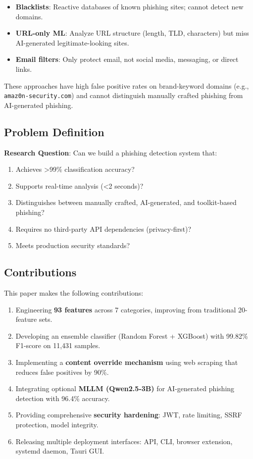 \documentclass[10pt, conference]{IEEEtran}
\begin{document}
\begin{itemize}
    \item \textbf{Blacklists}: Reactive databases of known phishing sites; cannot detect new domains.
    \item \textbf{URL-only ML}: Analyze URL structure (length, TLD, characters) but miss AI-generated legitimate-looking sites.
    \item \textbf{Email filters}: Only protect email, not social media, messaging, or direct links.
\end{itemize}

These approaches have high false positive rates on brand-keyword domains (e.g., \texttt{amaz0n-security.com}) and cannot distinguish manually crafted phishing from AI-generated phishing.

\subsection{Problem Definition}

\textbf{Research Question}: Can we build a phishing detection system that:
\begin{enumerate}
    \item Achieves >99\% classification accuracy?
    \item Supports real-time analysis (<2 seconds)?
    \item Distinguishes between manually crafted, AI-generated, and toolkit-based phishing?
    \item Requires no third-party API dependencies (privacy-first)?
    \item Meets production security standards?
\end{enumerate}

\subsection{Contributions}

This paper makes the following contributions:
\begin{enumerate}
    \item Engineering \textbf{93 features} across 7 categories, improving from traditional 20-feature sets.
    \item Developing an ensemble classifier (Random Forest + XGBoost) with 99.82\% F1-score on 11,431 samples.
    \item Implementing a \textbf{content override mechanism} using web scraping that reduces false positives by 90\%.
    \item Integrating optional \textbf{MLLM (Qwen2.5-3B)} for AI-generated phishing detection with 96.4\% accuracy.
    \item Providing comprehensive \textbf{security hardening}: JWT, rate limiting, SSRF protection, model integrity.
    \item Releasing multiple deployment interfaces: API, CLI, browser extension, systemd daemon, Tauri GUI.
\end{enumerate}
\end{document}
